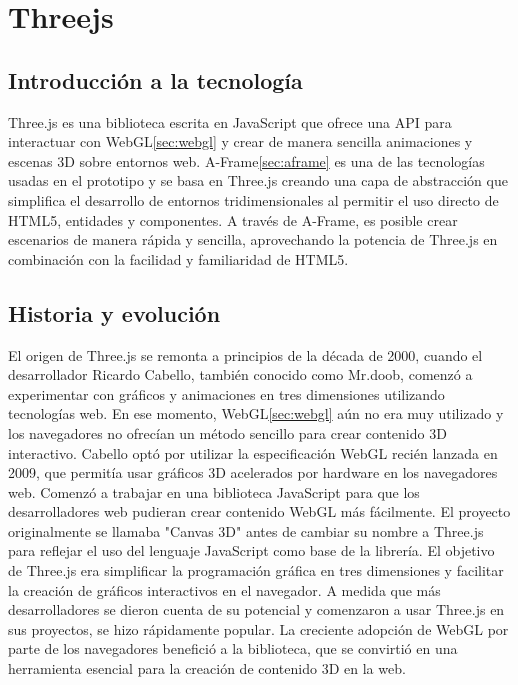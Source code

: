\documentclass[a4paper, 11pt]{book}
\begin{document}
\section{Threejs}
\label{sec:threejs}
\subsection{Introducción a la tecnología}
Three.js es una biblioteca escrita en JavaScript que ofrece una API para interactuar con WebGL\ref{sec:webgl} y crear de manera sencilla animaciones y escenas 3D sobre entornos web. A-Frame\ref{sec:aframe} es una de las tecnologías usadas en el prototipo y se basa en Three.js creando una capa de abstracción que simplifica el desarrollo de entornos tridimensionales al permitir el uso directo de HTML5, entidades y componentes. A través de A-Frame, es posible crear escenarios de manera rápida y sencilla, aprovechando la potencia de Three.js en combinación con la facilidad y familiaridad de HTML5.
\subsection{Historia y evolución}
El origen de Three.js se remonta a principios de la década de 2000, cuando el desarrollador Ricardo Cabello, también conocido como Mr.doob, comenzó a experimentar con gráficos y animaciones en tres dimensiones utilizando tecnologías web. En ese momento, WebGL\ref{sec:webgl} aún no era muy utilizado y los navegadores no ofrecían un método sencillo para crear contenido 3D interactivo.
Cabello optó por utilizar la especificación WebGL recién lanzada en 2009, que permitía usar gráficos 3D acelerados por hardware en los navegadores web. Comenzó a trabajar en una biblioteca JavaScript para que los desarrolladores web pudieran crear contenido WebGL más fácilmente.
El proyecto originalmente se llamaba "Canvas 3D" antes de cambiar su nombre a Three.js para reflejar el uso del lenguaje JavaScript como base de la librería.
El objetivo de Three.js era simplificar la programación gráfica en tres dimensiones y facilitar la creación de gráficos interactivos en el navegador.
A medida que más desarrolladores se dieron cuenta de su potencial y comenzaron a usar Three.js en sus proyectos, se hizo rápidamente popular. La creciente adopción de WebGL por parte de los navegadores benefició a la biblioteca, que se convirtió en una herramienta esencial para la creación de contenido 3D en la web.
\end{document}
